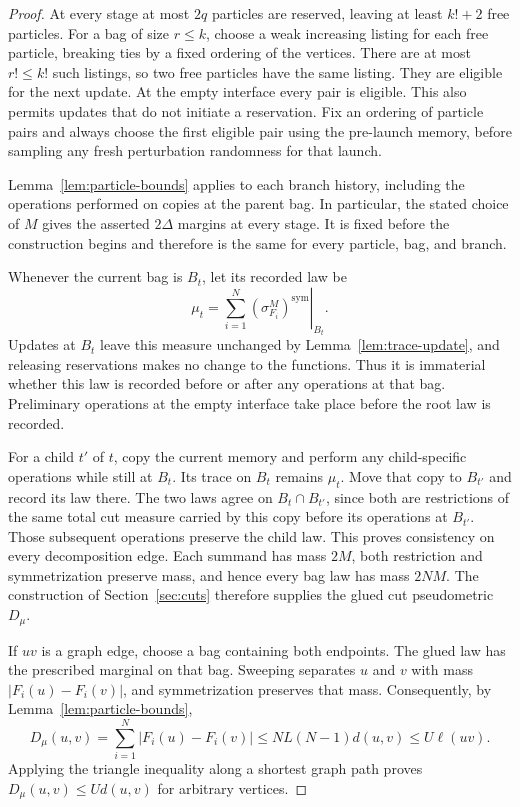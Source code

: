 \begin{proof}
At every stage at most $2q$ particles are reserved, leaving at least
$k!+2$ free particles.  For a bag of size $r\le k$, choose a weak
increasing listing for each free particle, breaking ties by a fixed
ordering of the vertices.  There are at most $r!\le k!$ such listings,
so two free particles have the same listing.  They are eligible for the
next update.  At the empty interface every pair is eligible.  This
also permits updates that do not initiate a reservation.
Fix an ordering of particle pairs and always choose the first eligible
pair using the pre-launch memory, before sampling any fresh perturbation
randomness for that launch.

Lemma~\ref{lem:particle-bounds} applies to each branch history, including
the operations performed on copies at the parent bag.  In particular,
the stated choice of $M$ gives the asserted $2\Delta$ margins at every
stage.  It is fixed before the construction begins and therefore is the
same for every particle, bag, and branch.

Whenever the current bag is $B_t$, let its recorded law be
\[
 \mu_t=
 \left.\sum_{i=1}^N(\sigma_{F_i}^M)^{\mathrm{sym}}\right|_{B_t}.
\]
Updates at $B_t$ leave this measure unchanged by
Lemma~\ref{lem:trace-update}, and releasing reservations makes no change
to the functions.  Thus it is immaterial whether this law is recorded
before or after any operations at that bag.  Preliminary operations at
the empty interface take place before the root law is recorded.

For a child $t'$ of $t$, copy the current memory and perform any
child-specific operations while still at $B_t$.  Its trace on $B_t$
remains $\mu_t$.  Move that copy to $B_{t'}$ and record its law there.
The two laws agree on $B_t\cap B_{t'}$, since both are restrictions of
the same total cut measure carried by this copy before its operations
at $B_{t'}$.  Those subsequent operations preserve the child law.
This proves consistency on every decomposition edge.  Each summand has
mass $2M$, both restriction and symmetrization preserve mass, and hence
every bag law has mass $2NM$.  The construction of
Section~\ref{sec:cuts} therefore supplies the glued cut pseudometric $D_\mu$.

If $uv$ is a graph edge, choose a bag containing both endpoints.  The
glued law has the prescribed marginal on that bag.  Sweeping separates
$u$ and $v$ with mass $|F_i(u)-F_i(v)|$, and symmetrization preserves
that mass.  Consequently, by Lemma~\ref{lem:particle-bounds},
\[
 D_\mu(u,v)
 =\sum_{i=1}^N|F_i(u)-F_i(v)|
 \le NL(N-1)d(u,v)
 \le U\ell(uv).
\]
Applying the triangle inequality along a shortest graph path proves
$D_\mu(u,v)\le U d(u,v)$ for arbitrary vertices.


\end{proof}
